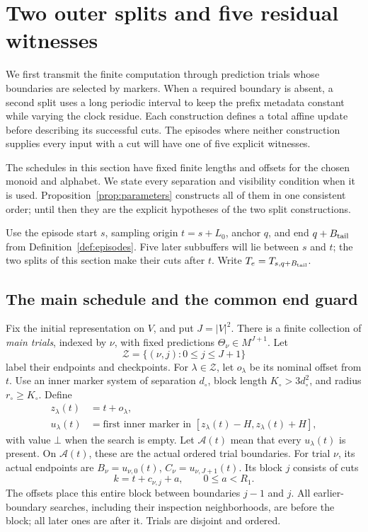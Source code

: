 \section{Two outer splits and five residual witnesses}\label{sec:outer}

We first transmit the finite computation through prediction trials whose
boundaries are selected by markers. When a required boundary is absent,
a second split uses a long periodic interval to keep the prefix metadata
constant while varying the clock residue. Each construction defines a total
affine update before describing its successful cuts. The episodes where
neither construction supplies every input with a cut will have one of five
explicit witnesses.

The schedules in this section have fixed finite lengths and offsets for
the chosen monoid and alphabet. We state every separation and visibility
condition when it is used. Proposition~\ref{prop:parameters} constructs
all of them in one consistent order; until then they are the explicit
hypotheses of the two split constructions.

Use the episode start \(s\), sampling origin \(t=s+L_0\), anchor \(q\), and end
\(q+B_{\rm tail}\) from Definition~\ref{def:episodes}. Five later subbuffers
will lie between \(s\) and \(t\); the two splits of this section make their cuts
after \(t\). Write \(T_e=T_{s,q+B_{\rm tail}}\).

\subsection{The main schedule and the common end guard}

Fix the initial representation on \(V\), and put \(J=|V|^2\).
There is a finite collection of \emph{main trials}, indexed by \(\nu\),
with fixed predictions \(\Theta_\nu\in M^{J+1}\).
Let
\[
             \mathcal Z=\{(\nu,j):0\le j\le J+1\}
\]
label their endpoints and checkpoints. For \(\lambda\in\mathcal Z\), let
\(o_\lambda\) be its nominal offset from \(t\). Use an inner marker system
of separation \(d_\circ\), block length \(K_\circ>3d_\circ^2\), and radius
\(r_\circ\ge K_\circ\). Define
\begin{equation}\label{eq:main-boundaries}
\begin{split}
 z_\lambda(t)&=t+o_\lambda,\\
 u_\lambda(t)&=\text{first inner marker in }
 [z_\lambda(t)-H,z_\lambda(t)+H],
\end{split}
\end{equation}
with value \(\bot\) when the search is empty.
Let \(\mathcal A(t)\) mean that every \(u_\lambda(t)\) is present.
On \(\mathcal A(t)\), these are the actual ordered trial boundaries.
For trial \(\nu\), its actual endpoints are
\(B_\nu=u_{\nu,0}(t)\), \(C_\nu=u_{\nu,J+1}(t)\).
Its block \(j\) consists of cuts
\begin{equation}\label{eq:main-cuts}
                 k=t+c_{\nu,j}+a,\qquad 0\le a<R_1.
\end{equation}
The offsets place this entire block between boundaries \(j-1\) and \(j\).
All earlier-boundary searches, including their inspection neighborhoods, are
before the block; all later ones are after it. Trials are disjoint and ordered.

